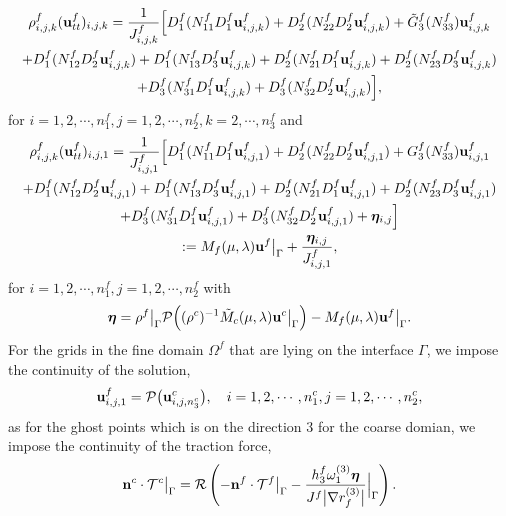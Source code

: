 \documentclass[a4paper]{article}
\begin{document}
\begin{multline}\label{fine_scheme_2}
\rho_{i,j,k}^f ({\bf u}_{tt}^f)_{i,j,k} =
 \frac{1}{J_{i,j,k}^f}\Big[D_1^f(N_{11}^fD_1^f{\bf u}_{i,j,k}^f)+D_2^f(N_{22}^fD_2^f{\bf u}_{i,j,k}^f)+\tilde{G}_3^f(N_{33}^f){\bf u}_{i,j,k}^f\\
+D_1^f(N_{12}^fD_2^f{\bf u}_{i,j,k}^f)+D_1^f(N_{13}^fD_3^f{\bf u}_{i,j,k}^f)
+D_2^f(N_{21}^fD_1^f{\bf u}_{i,j,k}^f)+D_2^f(N_{23}^fD_3^f{\bf u}_{i,j,k}^f)\\
+D_3^f(N_{31}^fD_1^f{\bf u}_{i,j,k}^f)
+D_3^f(N_{32}^fD_2^f{\bf u}_{i,j,k}^f)\Big],
\end{multline}
for $ i = 1,2,\cdots,n_1^f, j = 1,2,\cdots,n_2^f, k = 2,\cdots,n_3^f$ and
\begin{multline}\label{fine_scheme_1}
\rho_{i,j,k}^f ({\bf u}_{tt}^f)_{i,j,1} = \frac{1}{J_{i,j,1}^f}\Big[D_1^f(N_{11}^fD_1^f{\bf u}_{i,j,1}^f)+D_2^f(N_{22}^fD_2^f{\bf u}_{i,j,1}^f)+G_3^f(N_{33}^f){\bf u}_{i,j,1}^f\\
+D_1^f(N_{12}^fD_2^f{\bf u}_{i,j,1}^f)+D_1^f(N_{13}^fD_3^f{\bf u}_{i,j,1}^f)+D_2^f(N_{21}^fD_1^f{\bf u}_{i,j,1}^f)+D_2^f(N_{23}^fD_3^f{\bf u}_{i,j,1}^f)\\
+D_3^f(N_{31}^fD_1^f{\bf u}_{i,j,1}^f)+D_3^f(N_{32}^fD_2^f{\bf u}_{i,j,1}^f)+{\bm \eta}_{i,j}\Big]\\
 := M_f(\mu,\lambda){\bf u}^f\big|_\Gamma+\frac{{\bm \eta}_{i,j}}{J^f_{i,j,1}},
\end{multline}
for $ i = 1,2,\cdots,n_1^f, j = 1,2,\cdots,n_2^f$ with
\begin{equation*}
{\bm \eta} = \rho^f\big|_\Gamma\mathcal{P}\Big((\rho^c)^{-1}\tilde{M}_c(\mu,\lambda){\bf u}^c\big|_\Gamma\Big)-M_f(\mu,\lambda){\bf u}^f\big|_\Gamma.
\end{equation*}
For the grids in the fine domain $\Omega^f$  that are lying on the interface $\Gamma$, we impose the continuity of the solution,
\begin{equation}\label{data_continuous_curvi}
{\bf u}_{i,j,1}^f = \mathcal{P}\big({\bf u}_{i,j,n_3^c}^c\big), \ \ \ i = 1,2,\cdots,n_1^c, j = 1,2,\cdots,n_2^c,
\end{equation}
as for the ghost points which is on the direction 3 for the coarse domian, we impose the continuity of the traction force,
\begin{equation}\label{traction_continuous_curvi}
{\bf n}^c\cdot\mathcal{T}^c \big|_\Gamma = \mathcal{R}\left(-{\bf n}^f\cdot\mathcal{T}^f\big|_\Gamma - \frac{h_3^f\omega_1^{(3)}{\bm \eta}}{J^f\big|\nabla r_f^{(3)}\big|}\Big|_\Gamma\right).
\end{equation}
\end{document}
